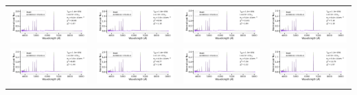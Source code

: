 \begin{table}
\begin{tabular}{l l l l }
    \includegraphics[width=0.24\linewidth, clip]{Figs/model_140000_37.27_3.78.pdf} & \includegraphics[width=0.24\linewidth, clip]{Figs/model_160000_36.86_3.54.pdf} & \includegraphics[width=0.24\linewidth, clip]{Figs/model_120000_37.27_3.70.pdf} & \includegraphics[width=0.24\linewidth, clip]{Figs/model_130000_37.32_3.78.pdf} \\
    \includegraphics[width=0.24\linewidth, clip]{Figs/model_130000_37.03_3.54.pdf} & \includegraphics[width=0.24\linewidth, clip]{Figs/model_140000_37.08_3.65.pdf} & \includegraphics[width=0.24\linewidth, clip]{Figs/model_130000_37.22_3.70.pdf} & \includegraphics[width=0.24\linewidth, clip]{Figs/model_120000_37.32_3.74.pdf} \\

\end{tabular}
\end{table}
